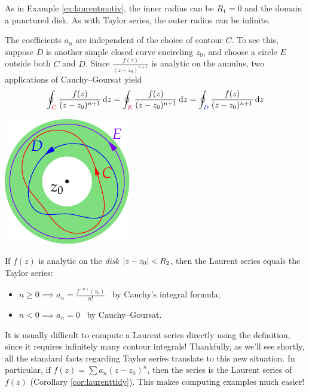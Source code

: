\begin{itemize}
  \item As in Example \ref{ex:laurentmotiv}, the inner radius can be $R_1=0$ and the domain a punctured disk. As with Taylor series, the outer radius can be infinite.\par
  \begin{minipage}[t]{0.73\linewidth}\vspace{0pt}
	\item The coefficients $a_n$ are independent of the choice of contour $C$.\smallbreak
	To see this, suppose $D$ is another simple closed curve encircling $z_0$, and choose a circle $E$ outside both $C$ and $D$. Since $\frac{f(z)}{(z-z_0)^{n+1}}$ is analytic on the annulus, two applications of Cauchy--Goursat yield
  \[\oint_{\textcolor{red}{C}}\frac{f(z)}{(z-z_0)^{n+1}}\,{\mathrm{d} z}=\oint_{\textcolor{purple}{E}}\frac{f(z)}{(z-z_0)^{n+1}}\,{\mathrm{d} z}=\oint_{\textcolor{blue}{D}}\frac{f(z)}{(z-z_0)^{n+1}}\,{\mathrm{d} z}\]
	\end{minipage}\begin{minipage}[t]{0.27\linewidth}\vspace{-5pt}
	\flushright\includegraphics{laurent3}
	\end{minipage}\par
  
  \item If $f(z)$ is analytic on the \emph{disk} $\left| z-z_0\right|<R_2$, then the Laurent series equals the Taylor series:
\begin{itemize}
  \item $n\ge 0\implies a_n=\frac{f^{(n)}(z_0)}{n!}$ \ by Cauchy's integral formula;
  \item $n<0\implies a_n=0$ \ by Cauchy--Goursat.
\end{itemize}
\end{itemize}

It is usually difficult to compute a Laurent series directly using the definition, since it requires infinitely many contour integrals! Thankfully, as we'll see shortly, all the standard facts regarding Taylor series translate to this new situation. In particular, if $f(z)=\sum a_n(z-z_0)^n$, then the series is the Laurent series of $f(z)$ (Corollary \ref{cor:laurenttidy}). This makes computing examples much easier!


